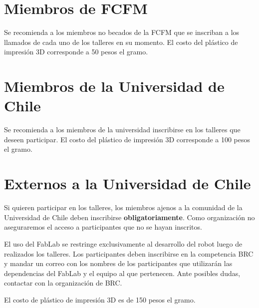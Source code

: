 \section{Miembros de FCFM}

Se recomienda a los miembros no becados de la FCFM que se inscriban a los llamados de cada uno de los talleres en su momento. 
El costo del plástico de impresión 3D corresponde a 50 pesos el gramo.

\section{Miembros de la Universidad de Chile}

Se recomienda a los miembros de la universidad inscribirse en los talleres que deseen participar.
El costo del plástico de impresión 3D corresponde a 100 pesos el gramo.

\section{Externos a la Universidad de Chile}
Si quieren participar en los talleres, los miembros ajenos a la comunidad de la Universidad de Chile deben inscribirse \textbf{obligatoriamente}. 
Como organización no aseguraremos el acceso a participantes que no se hayan inscritos.

El uso del FabLab se restringe exclusivamente al desarrollo del robot luego de realizados los talleres.
Los participantes deben inscribirse en la competencia BRC y mandar un correo con los nombres de los participantes que utilizarán las dependencias del FabLab y el equipo al que pertenecen.
Ante posibles dudas, contactar con la organización de BRC.

El costo de plástico de impresión 3D es de 150 pesos el gramo.


